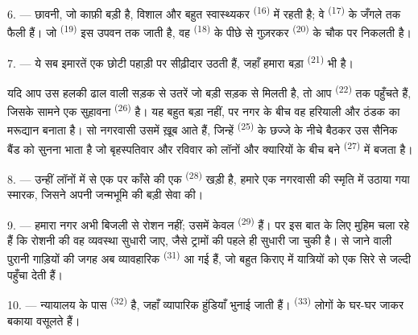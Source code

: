\VUsaut{5.0mm}
\VUsaut{3.4mm}

6. --- छावनी, जो काफ़ी बड़ी है, विशाल और बहुत स्वास्थ्यकर 
\textsuperscript{(16)} में रहती है; वे  \textsuperscript{(17)} के
जँगले तक फैली हैं। जो  \textsuperscript{(19)} इस उपवन तक जाती
है, वह  \textsuperscript{(18)} के पीछे से गुज़रकर
 \textsuperscript{(20)} के चौक पर निकलती है।

7. --- ये सब इमारतें एक छोटी पहाड़ी पर सीढ़ीदार उठती हैं, जहाँ हमारा बड़ा
 \textsuperscript{(21)} भी है।

यदि आप उस हलकी ढाल वाली सड़क से उतरें जो बड़ी सड़क से मिलती है, तो आप
 \textsuperscript{(22)} तक पहुँचते हैं, जिसके सामने एक सुहावना
 \textsuperscript{(26)} है। यह  बहुत बड़ा नहीं,
पर नगर के बीच वह हरियाली और ठंडक का मरूद्यान बनाता है। सो नगरवासी उसमें ख़ूब आते
हैं, जिन्हें  \textsuperscript{(25)} के छज्जे के नीचे बैठकर उस
सैनिक बैंड को सुनना भाता है जो बृहस्पतिवार और रविवार को लॉनों और क्यारियों के
बीच बने  \textsuperscript{(27)} में बजता है।

8. --- उन्हीं लॉनों में से एक पर काँसे की एक 
\textsuperscript{(28)} खड़ी है, हमारे एक नगरवासी की स्मृति में उठाया गया स्मारक,
जिसने अपनी जन्मभूमि की बड़ी सेवा की।

\VUsaut{4.0mm}
\VUsaut{3.4mm}

9. --- हमारा नगर अभी बिजली से रोशन नहीं; उसमें केवल 
\textsuperscript{(29)} हैं। पर  इस बात के लिए मुहिम चला रहे
हैं कि रोशनी की वह व्यवस्था सुधारी जाए, जैसे ट्रामों की
 पहले ही सुधारी जा चुकी है।  से
 जाने वाली पुरानी गाड़ियों की जगह अब व्यावहारिक
 \textsuperscript{(31)} आ गई हैं, जो बहुत 
किराए में यात्रियों को  एक सिरे से  जल्दी पहुँचा
देती हैं।

10. --- न्यायालय के पास  \textsuperscript{(32)} है, जहाँ व्यापारिक
हुंडियाँ भुनाई जाती हैं।  \textsuperscript{(33)} लोगों के
घर-घर जाकर बकाया वसूलते हैं।

\VUsaut{4.0mm}
\VUsaut{3.4mm}

